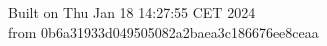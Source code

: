 {\noindent Built on Thu Jan 18 14:27:55 CET 2024} \\ 
 {\noindent from 0b6a31933d049505082a2baea3c186676ee8ceaa}
